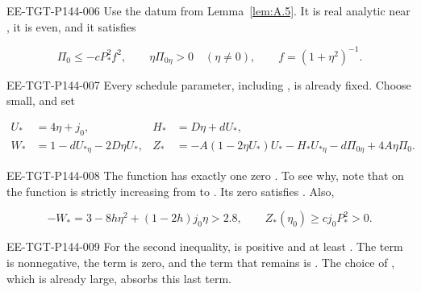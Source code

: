 \begin{EESegment}{EE-TGT-P144-006}
Use the datum  from Lemma~\ref{lem:A.5}. It is real analytic near
, it is even, and it satisfies
\end{EESegment}
\[
  \Pi_0\leq-cP_*^2f^2,
  \qquad \eta\Pi_{0\eta}>0\quad(\eta\neq 0),
  \qquad f=(1+\eta^2)^{-1}.
\]
\begin{EESegment}{EE-TGT-P144-007}
Every schedule parameter, including , is already fixed. Choose
 small, and set
\end{EESegment}
\begin{equation}
\begin{aligned}
  U_*&=4\eta+j_0, & H_*&=D\eta+dU_*,\\
  W_*&=1-dU_{*\eta}-2D\eta U_*,
  & Z_*&=-A(1-2\eta U_*)U_*-H_*U_{*\eta}-d\Pi_{0\eta}+4A\eta\Pi_0.
\end{aligned}
\tag{B.1}\label{eq:B.1}
\end{equation}
\begin{EESegment}{EE-TGT-P144-008}
The function  has exactly one zero
. To see why, note that on  the function
 is strictly increasing from
 to . Its zero satisfies
. Also,
\end{EESegment}
\[
  -W_*=3-8h\eta^2+(1-2h)j_0\eta>2.8,
  \qquad Z_*(\eta_0)\geq cj_0P_*^2>0.
\]
\begin{EESegment}{EE-TGT-P144-009}
For the second inequality,  is positive and at least
. The term  is nonnegative, the
 term is zero, and the term that remains is . The choice of
, which is already large, absorbs this last term.
\end{EESegment}

